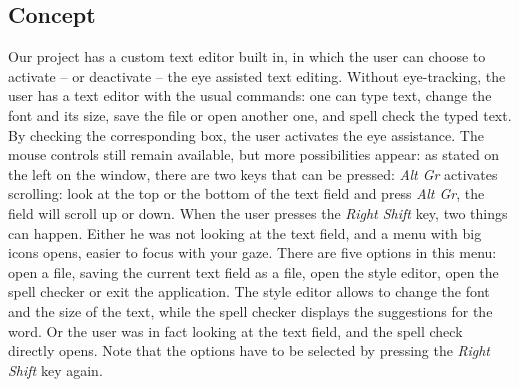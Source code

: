 \documentclass[12pt, a4paper]{article}
\begin{document}
\subsection{Concept}
Our project has a custom text editor built in, in which the user can choose to activate -- or deactivate -- the eye assisted text editing. Without eye-tracking, the user has a text editor with the usual commands: one can type text, change the font and its size, save the file or open another one, and spell check the typed text. By checking the corresponding box, the user activates the eye assistance. The mouse controls still remain available, but more possibilities appear: as stated on the left on the window, there are two keys that can be pressed: \textit{Alt Gr} activates scrolling: look at the top or the bottom of the text field and press \textit{Alt Gr}, the field will scroll up or down. When the user presses the \textit{Right Shift} key, two things can happen. Either he was not looking at the text field, and a menu with big icons opens, easier to focus with your gaze. There are five options in this menu: open a file, saving the current text field as a file, open the style editor, open the spell checker or exit the application. The style editor allows to change the font and the size of the text, while the spell checker displays the suggestions for the word. Or the user was in fact looking at the text field, and the spell check directly opens. Note that the options have to be selected by pressing the \textit{Right Shift} key again. 
\end{document}
